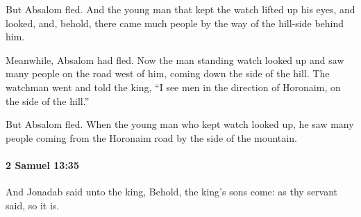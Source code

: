 			\begin{versebox}
					\item[BHS] 
					\item[ASV] But Absalom fled. And the young man that kept the watch lifted up his eyes, and looked, and, behold, there came much people by the way of the hill-side behind him.
					\item[NIV] Meanwhile, Absalom had fled. Now the man standing watch looked up and saw many people on the road west of him, coming down the side of the hill. The watchman went and told the king, “I see men in the direction of Horonaim, on the side of the hill.”
					\item[NRSV] But Absalom fled. When the young man who kept watch looked up, he saw many people coming from the Horonaim road by the side of the mountain.
			\end{versebox}

		\paragraph{2 Samuel 13:35} %
			\label{2SAMUEL-13-35}

			And Jonadab said unto the king, Behold, the king’s sons come: as thy servant said, so it is.

